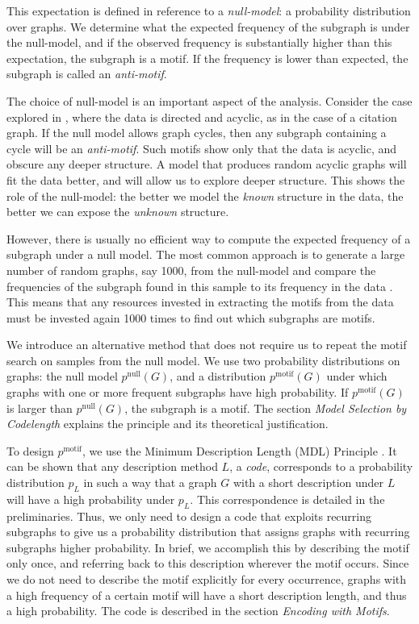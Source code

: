 This expectation is defined in reference to a \emph{null-model}: a probability distribution over graphs. We determine what the expected frequency of the subgraph is under the null-model, and if the observed frequency is substantially higher than this expectation, the subgraph is a motif. If the frequency is lower than expected, the subgraph is called an \emph{anti-motif}.

The choice of null-model is an important aspect of the analysis. Consider the case explored in \cite{carstens2013motifs}, where the data is directed and acyclic, as in the case of a citation graph. If the null model allows graph cycles, then any subgraph containing a cycle will be an \emph{anti-motif}. Such motifs show only that the data is acyclic, and obscure any deeper structure. A model that produces random acyclic graphs will fit the data better, and will allow us to explore deeper structure. This shows the role of the null-model: the better we model the \emph{known} structure in the data, the better we can expose the \emph{unknown} structure. 

However, there is usually no efficient way to compute the expected frequency of a subgraph under a null model. The most common approach is to generate a large number of random graphs, say 1000, from the null-model and compare the frequencies of the subgraph found in this sample to its frequency in the data \cite{milo2002network}. This means that any resources invested in extracting the motifs from the data must be invested again 1000 times to find out which subgraphs are motifs.

We introduce an alternative method that does not require us to repeat the motif search on samples from the null model. We use two probability distributions on graphs: the null model $p^\text{null}(G)$, and a distribution $p^\text{motif}(G)$ under which graphs with one or more frequent subgraphs have high probability. If $p^\text{motif}(G)$ is larger than $p^\text{null}(G)$, the subgraph is a motif. The section \emph{Model Selection by Codelength} explains the principle and its theoretical justification.

To design $p^\text{motif}$, we use the Minimum Description Length (MDL) Principle \cite{rissanen1978modeling,grunwald2007minimum}. It can be shown that any description method $L$, a \emph{code}, corresponds to a probability distribution $p_L$ in such a way that a graph $G$ with a short description under $L$ will have a high probability under $p_L$. This correspondence is detailed in the preliminaries. Thus, we only need to design a code that exploits recurring subgraphs to give us a probability distribution that assigns graphs with recurring subgraphs higher probability. In brief, we accomplish this by describing the motif only once, and referring back to this description wherever the motif occurs. Since we do not need to describe the motif explicitly for every occurrence, graphs with a high frequency of a certain motif will have a short description length, and thus a high probability. The code is described in the section \emph{Encoding with Motifs}.

